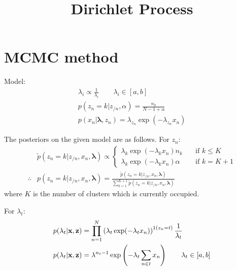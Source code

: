 \documentclass{article}
\title{Dirichlet Process}
\date{}
\begin{document}
\maketitle

\section{MCMC method}
Model:
\begin{align}
\lambda_i\propto\frac{1}{\lambda_i}\qquad \lambda_i\in[a,b]\\
p(z_n=k|z_{/n},\alpha)=\frac{n_k}{N-1+\alpha}\\
p(x_n|\mathbf{\lambda},z_n)=\lambda_{z_n}\exp(-\lambda_{z_n}x_n)
\end{align}

The posteriors on the given model are as follows. For $z_n$:
\begin{align}
\nonumber & \tilde{p}(z_n=k|z_{/n},x_n,\mathbf{\lambda})\propto 
\begin{cases}
\lambda_{k}\exp(-\lambda_{k}x_n) n_k\quad & \text{if }k\le K\\
\lambda_{k}\exp(-\lambda_{k}x_n) \alpha\quad & \text{if }k= K+1
\end{cases}\\
 \therefore & p(z_n=k|z_{/n},x_n,\mathbf{\lambda})=\frac{\tilde{p}(z_n=k|z_{/n},x_n,\mathbf{\lambda})}{\sum_{k=1}^{K+1}\tilde{p}(z_n=k|z_{/n},x_n,\mathbf{\lambda})}
\end{align}
where $K$ is the number of clusters which is currently occupied.

For $\lambda_t$:
\begin{align}
\nonumber & p(\lambda_t|\mathbf{x},\mathbf{z})=\prod_{n=1}^{N}\left(\lambda_t\exp(-\lambda_t x_n)\right)^{1(z_n=t)}\frac{1}{\lambda_t}\\
& p(\lambda_t|\mathbf{x},\mathbf{z})=\lambda^{n_t-1}\exp\left(-\lambda_t\sum_{n\in t} x_n\right)\qquad \lambda_t\in [a,b]
\end{align}
\end{document}
